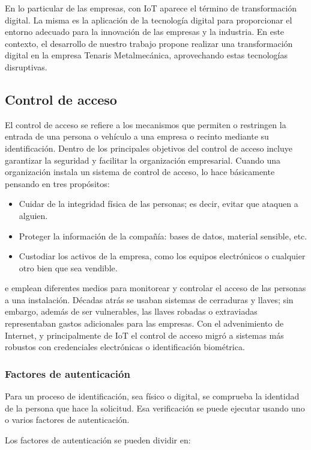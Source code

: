 En lo particular de las empresas, con IoT aparece el término de transformación digital. La misma es la aplicación de la tecnología digital para proporcionar el entorno adecuado para la innovación de las empresas y la industria. En este contexto, el desarrollo de nuestro trabajo propone realizar una transformación digital en la empresa Tenaris Metalmecánica, aprovechando estas tecnologías disruptivas.

\subsection{Control de acceso}

El control de acceso se refiere a los mecanismos que permiten o restringen la entrada de una persona o vehículo a una empresa o recinto mediante su identificación. Dentro de los principales objetivos del control de acceso incluye garantizar la seguridad y facilitar la organización empresarial. Cuando una organización instala un sistema de control de acceso, lo hace básicamente pensando en tres propósitos:
\begin{itemize}
\item Cuidar de la integridad física de las personas; es decir, evitar que ataquen a alguien.
\item Proteger la información de la compañía: bases de datos, material sensible, etc.
\item Custodiar los activos de la empresa, como los equipos electrónicos o cualquier otro bien que sea vendible.
\end{itemize}

e emplean diferentes medios para monitorear y controlar el acceso de las personas a una instalación. Décadas atrás se usaban sistemas de cerraduras y llaves; sin embargo, además de ser vulnerables, las llaves robadas o extraviadas representaban gastos adicionales para las empresas. Con el advenimiento de Internet, y principalmente de IoT el control de acceso migró a sistemas más robustos con credenciales electrónicas o identificación biométrica.

\subsubsection{Factores de autenticación}
Para un proceso de identificación, sea físico o digital, se comprueba la identidad de la persona que hace la solicitud. Esa verificación se puede ejecutar usando uno o varios factores de autenticación.

Los factores de autenticación se pueden dividir en:

